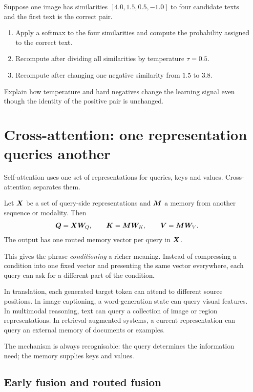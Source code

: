 \begin{optionalexercise}[title={Optional mathematics --- one row of InfoNCE}]
Suppose one image has similarities \([4.0,1.5,0.5,-1.0]\) to four candidate texts and the first text is the correct pair.

\begin{enumerate}[leftmargin=*]
  \item Apply a softmax to the four similarities and compute the probability assigned to the correct text.
  \item Recompute after dividing all similarities by temperature \(\tau=0.5\).
  \item Recompute after changing one negative similarity from \(1.5\) to \(3.8\).
\end{enumerate}
Explain how temperature and hard negatives change the learning signal even though the identity of the positive pair is unchanged.
\end{optionalexercise}

\section{Cross-attention: one representation queries another}

Self-attention uses one set of representations for queries, keys and values. Cross-attention separates them.

Let \(\bm{X}\) be a set of query-side representations and \(\bm{M}\) a memory from another sequence or modality. Then
\[
  \bm{Q}=\bm{X}\bm{W}_Q,
  \qquad
  \bm{K}=\bm{M}\bm{W}_K,
  \qquad
  \bm{V}=\bm{M}\bm{W}_V.
\]
The output has one routed memory vector per query in \(\bm{X}\).

This gives the phrase \emph{conditioning} a richer meaning. Instead of compressing a condition into one fixed vector and presenting the same vector everywhere, each query can ask for a different part of the condition.

In translation, each generated target token can attend to different source positions. In image captioning, a word-generation state can query visual features. In multimodal reasoning, text can query a collection of image or region representations. In retrieval-augmented systems, a current representation can query an external memory of documents or examples.

The mechanism is always recognisable: the query determines the information need; the memory supplies keys and values.

\subsection{Early fusion and routed fusion}

